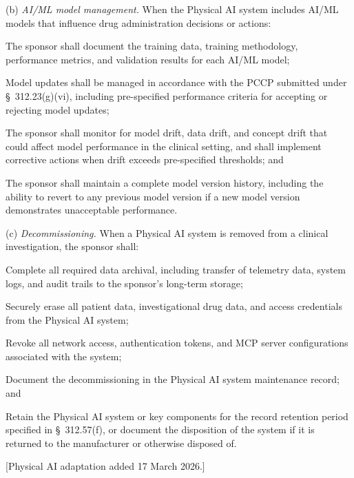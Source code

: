 (b) \textit{AI/ML model management.} When the Physical AI system includes AI/ML models that influence drug administration decisions or actions:

\begin{description}[leftmargin=0.8cm,style=sameline]
\item[(1)] The sponsor shall document the training data, training methodology, performance metrics, and validation results for each AI/ML model;
\item[(2)] Model updates shall be managed in accordance with the PCCP submitted under \S~312.23(g)(vi), including pre-specified performance criteria for accepting or rejecting model updates;
\item[(3)] The sponsor shall monitor for model drift, data drift, and concept drift that could affect model performance in the clinical setting, and shall implement corrective actions when drift exceeds pre-specified thresholds; and
\item[(4)] The sponsor shall maintain a complete model version history, including the ability to revert to any previous model version if a new model version demonstrates unacceptable performance.
\end{description}

(c) \textit{Decommissioning.} When a Physical AI system is removed from a clinical investigation, the sponsor shall:

\begin{description}[leftmargin=0.8cm,style=sameline]
\item[(1)] Complete all required data archival, including transfer of telemetry data, system logs, and audit trails to the sponsor's long-term storage;
\item[(2)] Securely erase all patient data, investigational drug data, and access credentials from the Physical AI system;
\item[(3)] Revoke all network access, authentication tokens, and MCP server configurations associated with the system;
\item[(4)] Document the decommissioning in the Physical AI system maintenance record; and
\item[(5)] Retain the Physical AI system or key components for the record retention period specified in \S~312.57(f), or document the disposition of the system if it is returned to the manufacturer or otherwise disposed of.
\end{description}

[Physical AI adaptation added 17 March 2026.]

